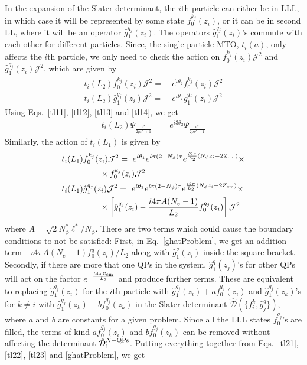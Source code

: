 \documentclass[prb,aps,epsfig,longbibliography,twocolumn]{revtex4-1}
\newcommand{\rbkt}[1]{\left( #1\right)}
\newcommand{\sbkt}[1]{\left[ #1\right]}
\newcommand{\np}{N_{\phi}}
\newcommand{\iiota}{\dot{\iota}}
\begin{document}
In the expansion of the Slater determinant, the $i$th particle can either be in LLL, in which case it will be represented by some state $f_0^{k_j}(z_i)$, or it can be in second LL, where it will be an operator $\hat{g}_1^{q_j}(z_i)$. The operators $\hat{g}_1^{q_j}(z_i)$'s commute with each other for different particles.  Since, the single particle MTO, $t_i(a)$, only affects the $i$th particle, we only need to check the action on $f_0^{k_j}(z_i)\mathcal{J}^2$ and $\hat{g}_1^{q_j}(z_i)\mathcal{J}^2$, which are given by 
\begin{align}
t_i(L_2)f_0^{k_j}(z_i)\mathcal{J}^2=&\ e^{\iiota \theta_2}  f_0^{k_j}(z_i)\mathcal{J}^2 \label{tl13}\\
t_i(L_2)\hat{g}_1^{q_j}(z_i)\mathcal{J}^2 =&\ e^{\iiota \theta_2} \hat{g}_1^{q_j}(z_i)\mathcal{J}^2 \label{tl14}
\end{align}
Using Eqs.~\eqref{tl11}, \eqref{tl12}, \eqref{tl13} and \eqref{tl14}, we get 
\begin{align}
t_i(L_2)\Psi_{\frac{\nu^*}{2p\nu^*+1}}&=e^{i3\theta_2}\Psi_{\frac{\nu^*}{2p\nu^*+1}}
\end{align}
Similarly, the action of $t_i(L_1)$ is given by
\begin{align}
t_i(L_1)&f_0^{k_j}(z_i)\mathcal{J}^2=\  e^{\iiota \theta_1}e^{\iiota\pi(2-\np)\tau}  e^{ \frac{\iiota 2\pi}{L_2} (\np z_i-2Z_{\rm cm})} \times \nonumber\\
&\quad\quad \times f_0^{k_j}(z_i)\mathcal{J}^2 \label{tl23}\\
t_i(L_1)&\hat{g}_1^{q_j}(z_i)\mathcal{J}^2=\ e^{\iiota \theta_1} e^{\iiota\pi(2-\np)\tau}  e^{ \frac{\iiota 2\pi}{L_2} (\np z_i-2Z_{\rm cm})} \times \nonumber\\
 &\quad \quad  \times   \sbkt{ \hat{g}_1^{q_j}(z_i)-\frac{\iiota 4\pi A (N_e-1)}{L_2}f_0^{q_j}(z_i)} \mathcal{J}^2 \label{ghatProblem}
\end{align}
where $A={\sqrt{2}\np^*\ell^*}/{\np}$. There are two terms which could cause the boundary conditions to not be satisfied: First, in Eq.~\eqref{ghatProblem}, we get an addition term $-{\iiota 4\pi A(N_e-1)}f_0^q(z_i)/{L_2}$ along with $\hat{g}_1^q(z_i)$ inside the square bracket. Secondly, if there are more that one QPs in the system,  $\hat{g}_1^q(z_j)$'s for other QPs will act on the factor $e^{ -\frac{\iiota 4\pi Z_{\rm cm}}{L_2}}$ and produce further terms. These are equivalent to replacing $\hat{g}_1^{q_j}(z_i)$ for the $i$th particle with $\hat{g}_1^{q_j}(z_i) + a f_0^{q_j}(z_i)$ and $\hat{g}_1^{q_j}(z_k)$'s for $k\neq i$ with $\hat{g}_1^{q_j}(z_k) + b  f_0^{q_j}(z_k)$ in the Slater determinant $\hat{\mathcal{D}}\rbkt{\{f^k_i,\hat{g}^q_j\}}$, where $a$ and $b$ are constants for a given problem. Since all the LLL states $f_0^{q_j}$'s are filled, the terms of kind $ a f_0^{q_j}(z_i)$ and $b f_0^{q_j}(z_k)$ can be removed without affecting the determinant $\hat{\mathcal{D}}^{ N\rm-QPs}_{1}$. Putting everything together from Eqs.~\eqref{tl21}, \eqref{tl22}, \eqref{tl23} and \eqref{ghatProblem}, we get
\end{document}
